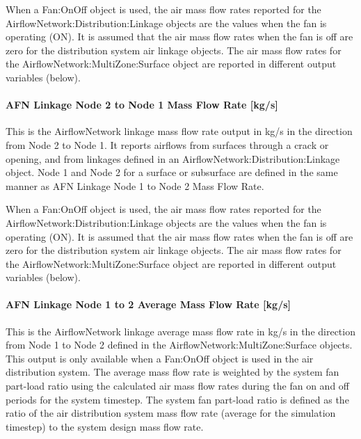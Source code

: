 When a Fan:OnOff object is used, the air mass flow rates reported for the AirflowNetwork:Distribution:Linkage objects are the values when the fan is operating (ON). It is assumed that the air mass flow rates when the fan is off are zero for the distribution system air linkage objects. The air mass flow rates for the AirflowNetwork:MultiZone:Surface object are reported in different output variables (below).

\paragraph{AFN Linkage Node 2 to Node 1 Mass Flow Rate {[}kg/s{]}}\label{afn-linkage-node-2-to-node-1-mass-flow-rate-kgs}

This is the AirflowNetwork linkage mass flow rate output in kg/s in the direction from Node 2 to Node 1. It reports airflows from surfaces through a crack or opening, and from linkages defined in an AirflowNetwork:Distribution:Linkage object. Node 1 and Node 2 for a surface or subsurface are defined in the same manner as AFN Linkage Node 1 to Node 2 Mass Flow Rate.

When a Fan:OnOff object is used, the air mass flow rates reported for the AirflowNetwork:Distribution:Linkage objects are the values when the fan is operating (ON). It is assumed that the air mass flow rates when the fan is off are zero for the distribution system air linkage objects. The air mass flow rates for the AirflowNetwork:MultiZone:Surface object are reported in different output variables (below).

\paragraph{AFN Linkage Node 1 to 2 Average Mass Flow Rate {[}kg/s{]}}\label{afn-linkage-node-1-to-2-average-mass-flow-rate-kgs}

This is the AirflowNetwork linkage average mass flow rate in kg/s in the direction from Node 1 to Node 2 defined in the AirflowNetwork:MultiZone:Surface objects. This output is only available when a Fan:OnOff object is used in the air distribution system. The average mass flow rate is weighted by the system fan part-load ratio using the calculated air mass flow rates during the fan on and off periods for the system timestep. The system fan part-load ratio is defined as the ratio of the air distribution system mass flow rate (average for the simulation timestep) to the system design mass flow rate.

